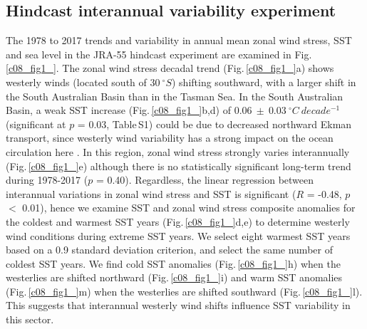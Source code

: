 \documentclass[draft,linenumbers]{agujournal2018}
\begin{document}
\subsection{Hindcast interannual variability experiment}
The 1978 to 2017 trends and variability in annual mean zonal wind stress, SST and sea level in the JRA-55 hindcast experiment are examined in Fig.\,\ref{c08_fig1_}. The zonal wind stress decadal trend (Fig.\,\ref{c08_fig1_}a) shows westerly winds (located south of $30\ ^{\circ}S$) shifting southward, with a larger shift in the South Australian Basin than in the Tasman Sea. In the South Australian Basin, a weak SST increase (Fig.\,\ref{c08_fig1_}b,d) of $0.06\ \pm\ 0.03\ ^{\circ}C\ decade^{-1}$ (significant at $p$ = 0.03, Table\,S1) could be due to decreased northward Ekman transport, since westerly wind variability has a strong impact on the ocean circulation here \citep{Middleton2007}. In this region, zonal wind stress strongly varies interannually (Fig.\,\ref{c08_fig1_}e) although there is no statistically significant long-term trend during 1978-2017 ($p$ = 0.40). Regardless, the linear regression between interannual variations in zonal wind stress and SST is significant ($R$ = -0.48, $p$ $<$ 0.01), hence we examine SST and zonal wind stress composite anomalies for the coldest and warmest SST years (Fig.\,\ref{c08_fig1_}d,e) to determine westerly wind conditions during extreme SST years. We select eight warmest SST years based on a 0.9 standard deviation criterion, and select the same number of coldest SST years. We find cold SST anomalies (Fig.\,\ref{c08_fig1_}h) when the westerlies are shifted northward (Fig.\,\ref{c08_fig1_}i) and warm SST anomalies (Fig.\,\ref{c08_fig1_}m) when the westerlies are shifted southward (Fig.\,\ref{c08_fig1_}l). This suggests that interannual westerly wind shifts influence SST variability in this sector. 
\end{document}
